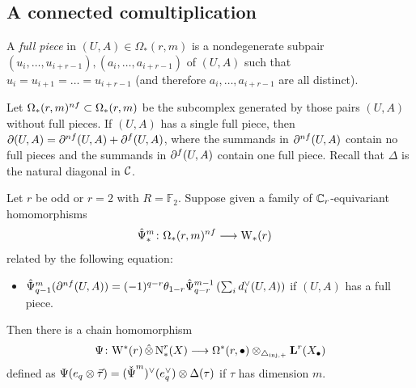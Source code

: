\subsection{A connected comultiplication} A \emph{full piece} in $(U,A)\in \Omega_*(r,m)$ is a nondegenerate subpair $(u_i,\ldots,u_{i+r-1}),(a_i,\ldots,a_{i+r-1})$ of $(U,A)$ such that $u_i = u_{i+1} = \ldots = u_{i+r-1}$ (and therefore $a_i,\ldots,a_{i+r-1}$ are all distinct). 


Let $\Omega_*(r,m)^{nf}\subset \Omega_*(r,m)$ be the subcomplex generated by those pairs $(U,A)$ without full pieces. If $(U,A)$ has a single full piece, then $\partial(U,A) = \partial^{nf}(U,A) + \partial^{f}(U,A)$, where the summands in $\partial^{nf}(U,A)$ contain no full pieces and the summands in $\partial^{f}(U,A)$ contain one full piece. Recall that $\Delta$ is the natural diagonal in $\mathcal{C}$.

\begin{proposition} \label{prop:omegarm}
	Let $r$ be odd or $r=2$ with $R=\mathbb{F}_2$. Suppose given a family of $\mathbb{C}_r$-equivariant homomorphisms
	\begin{align*}
		\hat{\Psi}_*^m\colon \Omega_*(r,m)^{nf}&\longrightarrow \mathrm{W}_*(r)
	\end{align*}
	related by the following equation:
	\begin{itemize}
    \item \label{it:1a}
		$\hat{\Psi}^m_{q-1}(\partial^{nf} (U,A)) = (-1)^{q-r}\theta_{1-r}\hat{\Psi}^{m-1}_{q-r}\left(\sum_i d_i^\vee(U,A)\right)$
   if $(U,A)$ has a full piece.
     	\end{itemize}
	Then there is a chain homomorphism
	\[
        \Psi\colon \mathrm{W}^*(r)\operatorname{\hat{\otimes}} \operatorname{N}^r_*(X)\longrightarrow \Omega^*(r,\bullet)\otimes_{\triangle_{\mathrm{inj},+}} \operatorname{\mathbf{L}}^r(X_\bullet)
    \]
	defined as $\Psi(e_q\otimes \vec{\tau}) = (\operatorname{\check{\Psi}}^m)^\vee(e_q^\vee)\otimes \Delta(\tau)$ if $\tau$ has dimension $m$.
\end{proposition}
\def\diaglin{\Delta}

